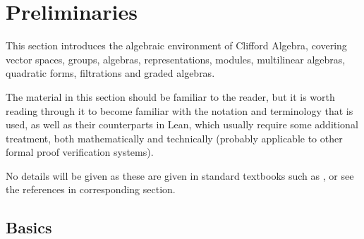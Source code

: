 \section{Preliminaries}
\label{cha:preliminaries}

This section introduces the algebraic environment of Clifford Algebra,
covering vector spaces, groups, algebras, representations, modules, multilinear algebras,
quadratic forms, filtrations and graded algebras.

The material in this section should be familiar to the reader, but it is worth reading
 through it to become familiar with the notation and terminology that is used,
 as well as their counterparts in Lean, which usually require some additional treatment, both
 mathematically and technically (probably applicable to other formal proof verification systems).

No details will be given as these are given in standard textbooks such as \cite{mac1999algebra}, or see the references in corresponding section.

\subsection{Basics}
\label{sec:basics}


